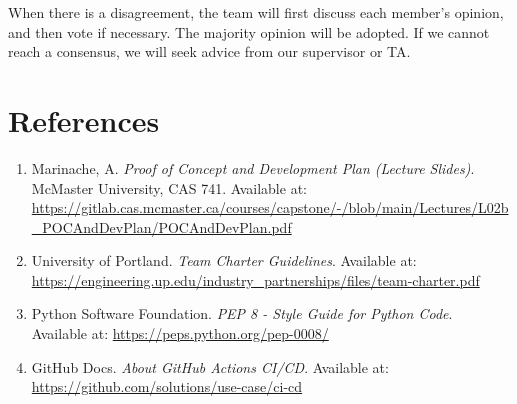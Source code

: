 \documentclass{article}
\begin{document}

When there is a disagreement, the team will first discuss each member's opinion, 
and then vote if necessary. The majority opinion will be adopted.
If we cannot reach a consensus, we will seek advice from our supervisor or TA.


\newpage{}

\section*{References}

\begin{enumerate}
  \item Marinache, A. \textit{Proof of Concept and Development Plan (Lecture Slides)}. McMaster University, CAS 741.  
  Available at: \url{https://gitlab.cas.mcmaster.ca/courses/capstone/-/blob/main/Lectures/L02b_POCAndDevPlan/POCAndDevPlan.pdf}

  \item University of Portland. \textit{Team Charter Guidelines}.  
  Available at: \url{https://engineering.up.edu/industry_partnerships/files/team-charter.pdf}

  \item Python Software Foundation. \textit{PEP 8 - Style Guide for Python Code}.  
  Available at: \url{https://peps.python.org/pep-0008/}

  \item GitHub Docs. \textit{About GitHub Actions CI/CD}.  
  Available at: \url{https://github.com/solutions/use-case/ci-cd}
\end{enumerate}
\end{document}
